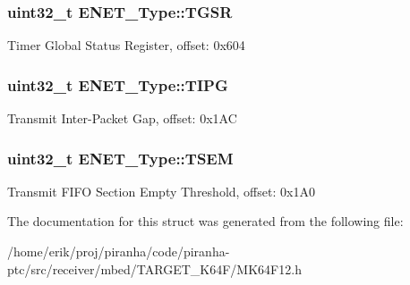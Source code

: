 \subsubsection[{\texorpdfstring{T\+G\+SR}{TGSR}}]{ uint32\+\_\+t E\+N\+E\+T\+\_\+\+Type\+::\+T\+G\+SR}\hypertarget{structENET__Type_a272b70e137ff861d88e01ede575cbd82}{}\label{structENET__Type_a272b70e137ff861d88e01ede575cbd82}
Timer Global Status Register, offset\+: 0x604 
\subsubsection[{\texorpdfstring{T\+I\+PG}{TIPG}}]{ uint32\+\_\+t E\+N\+E\+T\+\_\+\+Type\+::\+T\+I\+PG}\hypertarget{structENET__Type_af21e05048bc2b786d0d17147bf57ec36}{}\label{structENET__Type_af21e05048bc2b786d0d17147bf57ec36}
Transmit Inter-\/\+Packet Gap, offset\+: 0x1\+AC 
\subsubsection[{\texorpdfstring{T\+S\+EM}{TSEM}}]{ uint32\+\_\+t E\+N\+E\+T\+\_\+\+Type\+::\+T\+S\+EM}\hypertarget{structENET__Type_a832581c4ee3735edefec723badc44137}{}\label{structENET__Type_a832581c4ee3735edefec723badc44137}
Transmit F\+I\+FO Section Empty Threshold, offset\+: 0x1\+A0 

The documentation for this struct was generated from the following file\+:\begin{DoxyCompactItemize}
\item 
/home/erik/proj/piranha/code/piranha-\/ptc/src/receiver/mbed/\+T\+A\+R\+G\+E\+T\+\_\+\+K64\+F/M\+K64\+F12.\+h\end{DoxyCompactItemize}
